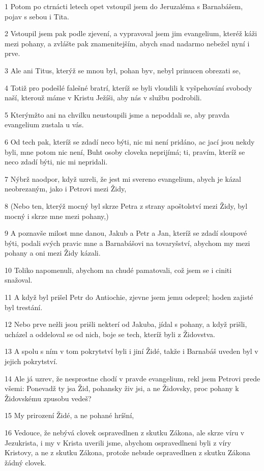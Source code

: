 \par 1 Potom po ctrnácti letech opet vstoupil jsem do Jeruzaléma s Barnabášem, pojav s sebou i Tita.
\par 2 Vstoupil jsem pak podle zjevení, a vypravoval jsem jim evangelium, kteréž káži mezi pohany, a zvlášte pak znamenitejším, abych snad nadarmo nebežel nyní i prve.
\par 3 Ale ani Titus, kterýž se mnou byl, pohan byv, nebyl prinucen obrezati se,
\par 4 Totiž pro podešlé falešné bratrí, kteríž se byli vloudili k vyšpehování svobody naší, kterouž máme v Kristu Ježíši, aby nás v službu podrobili.
\par 5 Kterýmžto ani na chvilku neustoupili jsme a nepoddali se, aby pravda evangelium zustala u vás.
\par 6 Od tech pak, kteríž se zdadí neco býti, nic mi není pridáno, ac jací jsou nekdy byli, mne potom nic není, Buht osoby cloveka neprijímá; ti, pravím, kteríž se neco zdadí býti, nic mi nepridali.
\par 7 Nýbrž naodpor, když uzreli, že jest mi svereno evangelium, abych je kázal neobrezaným, jako i Petrovi mezi Židy,
\par 8 (Nebo ten, kterýž mocný byl skrze Petra z strany apoštolství mezi Židy, byl mocný i skrze mne mezi pohany,)
\par 9 A poznavše milost mne danou, Jakub a Petr a Jan, kteríž se zdadí sloupové býti, podali svých pravic mne a Barnabášovi na tovaryšství, abychom my mezi pohany a oni mezi Židy kázali.
\par 10 Toliko napomenuli, abychom na chudé pamatovali, což jsem se i ciniti snažoval.
\par 11 A když byl prišel Petr do Antiochie, zjevne jsem jemu odeprel; hoden zajisté byl trestání.
\par 12 Nebo prve nežli jsou prišli nekterí od Jakuba, jídal s pohany, a když prišli, ucházel a oddeloval se od nich, boje se tech, kteríž byli z Židovstva.
\par 13 A spolu s ním v tom pokrytství byli i jiní Židé, takže i Barnabáš uveden byl v jejich pokrytství.
\par 14 Ale já uzrev, že nesprostne chodí v pravde evangelium, rekl jsem Petrovi prede všemi: Ponevadž ty jsa Žid, pohansky živ jsi, a ne Židovsky, proc pohany k Židovskému zpusobu vedeš?
\par 15 My prirození Židé, a ne pohané hríšní,
\par 16 Vedouce, že nebývá clovek ospravedlnen z skutku Zákona, ale skrze víru v Jezukrista, i my v Krista uverili jsme, abychom ospravedlneni byli z víry Kristovy, a ne z skutku Zákona, protože nebude ospravedlnen z skutku Zákona žádný clovek.
